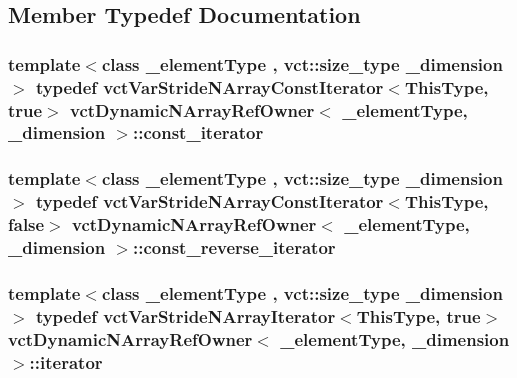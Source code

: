 \subsection{Member Typedef Documentation}
\hypertarget{classvct_dynamic_n_array_ref_owner_ab6652472746656a9be2de178295fd80b}{
\subsubsection[{const\-\_\-iterator}]{\setlength{\rightskip}{0pt plus 5cm}template$<$class \-\_\-element\-Type , vct\-::size\-\_\-type \-\_\-dimension$>$ typedef {\bf vct\-Var\-Stride\-N\-Array\-Const\-Iterator}$<${\bf This\-Type}, true$>$ {\bf vct\-Dynamic\-N\-Array\-Ref\-Owner}$<$ \-\_\-element\-Type, \-\_\-dimension $>$\-::{\bf const\-\_\-iterator}}}\label{classvct_dynamic_n_array_ref_owner_ab6652472746656a9be2de178295fd80b}
\hypertarget{classvct_dynamic_n_array_ref_owner_ade444e0883b2420a8a113171b6e49bf4}{
\subsubsection[{const\-\_\-reverse\-\_\-iterator}]{\setlength{\rightskip}{0pt plus 5cm}template$<$class \-\_\-element\-Type , vct\-::size\-\_\-type \-\_\-dimension$>$ typedef {\bf vct\-Var\-Stride\-N\-Array\-Const\-Iterator}$<${\bf This\-Type}, false$>$ {\bf vct\-Dynamic\-N\-Array\-Ref\-Owner}$<$ \-\_\-element\-Type, \-\_\-dimension $>$\-::{\bf const\-\_\-reverse\-\_\-iterator}}}\label{classvct_dynamic_n_array_ref_owner_ade444e0883b2420a8a113171b6e49bf4}
\hypertarget{classvct_dynamic_n_array_ref_owner_a9d68370074a5320a30354e700207ad71}{
\subsubsection[{iterator}]{\setlength{\rightskip}{0pt plus 5cm}template$<$class \-\_\-element\-Type , vct\-::size\-\_\-type \-\_\-dimension$>$ typedef {\bf vct\-Var\-Stride\-N\-Array\-Iterator}$<${\bf This\-Type}, true$>$ {\bf vct\-Dynamic\-N\-Array\-Ref\-Owner}$<$ \-\_\-element\-Type, \-\_\-dimension $>$\-::{\bf iterator}}}\label{classvct_dynamic_n_array_ref_owner_a9d68370074a5320a30354e700207ad71}
